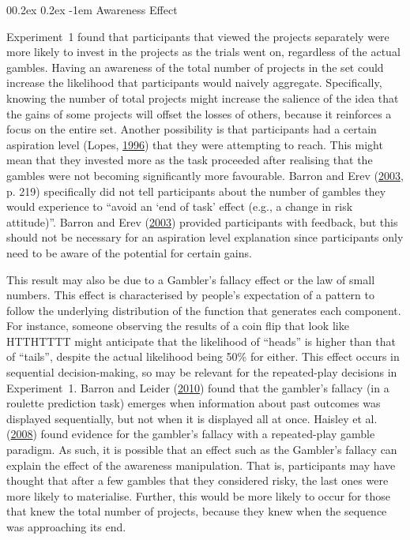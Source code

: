 \documentclass[
  english,
  man, donotrepeattitle,floatsintext]{apa7}
\makeatletter
\let\oldparagraph\paragraph
\renewcommand{\paragraph}[1]{\oldparagraph{#1}\mbox{}}
\renewcommand{\paragraph}{\@startsection{paragraph}{4}{\parindent}%
  {0\baselineskip \@plus 0.2ex \@minus 0.2ex}%
  {-1em}%
  {\normalfont\normalsize\bfseries\itshape\typesectitle}}
\theoremstyle{definition}
\theoremstyle{definition}
\theoremstyle{definition}
\theoremstyle{definition}
\theoremstyle{remark}
\makeatother
\begin{document}
\hypertarget{awareness-effect}{%
\paragraph{Awareness Effect}\label{awareness-effect}}

Experiment~1 found that participants that viewed the projects separately were
more likely to invest in the projects as the trials went on, regardless of the
actual gambles. Having an awareness of the total number of projects in the set
could increase the likelihood that participants would naively aggregate.
Specifically, knowing the number of total projects might increase the salience
of the idea that the gains of some projects will offset the losses of others,
because it reinforces a focus on the entire set. Another possibility is that
participants had a certain aspiration level (Lopes, \protect\hyperlink{ref-lopes1996}{1996}) that they were
attempting to reach. This might mean that they invested more as the task
proceeded after realising that the gambles were not becoming significantly more
favourable. Barron and Erev (\protect\hyperlink{ref-barron2003}{2003}, p. 219) specifically did not tell participants about
the number of gambles they would experience to ``avoid an `end of task' effect
(e.g., a change in risk attitude)''. Barron and Erev (\protect\hyperlink{ref-barron2003}{2003}) provided participants with
feedback, but this should not be necessary for an aspiration level explanation
since participants only need to be aware of the potential for certain gains.

This result may also be due to a Gambler's fallacy effect or the law of small
numbers. This effect is characterised by people's expectation of a pattern to
follow the underlying distribution of the function that generates each
component. For instance, someone observing the results of a coin flip that look
like HTTHTTTT might anticipate that the likelihood of ``heads'' is higher than
that of ``tails'', despite the actual likelihood being 50\% for either. This effect
occurs in sequential decision-making, so may be relevant for the repeated-play
decisions in Experiment~1. Barron and Leider (\protect\hyperlink{ref-barron2010}{2010}) found that the gambler's fallacy (in a
roulette prediction task) emerges when information about past outcomes was
displayed sequentially, but not when it is displayed all at once. Haisley et al. (\protect\hyperlink{ref-haisley2008}{2008})
found evidence for the gambler's fallacy with a repeated-play gamble paradigm.
As such, it is possible that an effect such as the Gambler's fallacy can explain
the effect of the awareness manipulation. That is, participants may have thought
that after a few gambles that they considered risky, the last ones were more
likely to materialise. Further, this would be more likely to occur for those
that knew the total number of projects, because they knew when the sequence was
approaching its end.
\end{document}
